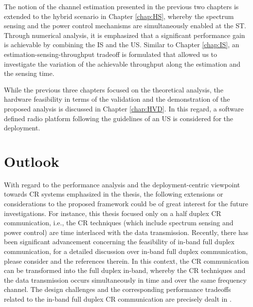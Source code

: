 The notion of the channel estimation presented in the previous two chapters is extended to the hybrid scenario in Chapter \ref{chap:HS}, whereby the spectrum sensing and the power control mechanisms are simultaneously enabled at the ST. Through numerical analysis, it is emphasized that a significant performance gain is achievable by combining the IS and the US. Similar to Chapter \ref{chap:IS}, an estimation-sensing-throughput tradeoff is formulated that allowed us to investigate the variation of the achievable throughput along the estimation and the sensing time. 

While the previous three chapters focused on the theoretical analysis, the hardware feasibility in terms of the validation and the demonstration of the proposed analysis is discussed in Chapter \ref{chap:HVD}. In this regard, a software defined radio platform following the guidelines of an US is considered for the deployment. 


\section{Outlook}
With regard to the performance analysis and the deployment-centric viewpoint towards CR systems emphasized in the thesis, the following extensions or considerations to the proposed framework could be of great interest for the future investigations. For instance, this thesis focused only on a half duplex CR communication, i.e., the CR techniques (which include spectrum sensing and power control) are time interlaced with the data transmission. Recently, there has been significant advancement concerning the feasibility of in-band full duplex communication, for a detailed discussion over in-band full duplex communication, please consider \cite{Bhar13, Sab14, Liu15} and the references therein. In this context, the CR communication can be transformed into the full duplex in-band, whereby the CR techniques and the data transmission occurs simultaneously in time and over the same frequency channel. The design challenges and the corresponding performance tradeoffs related to the in-band full duplex CR communication are precisely dealt in \cite{Liao15, Kim15}. 

